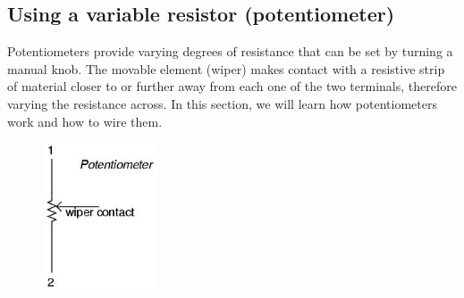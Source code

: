 \documentclass{article}
\begin{document}
\subsection*{Using a variable resistor (potentiometer)}
Potentiometers provide varying degrees of resistance that can be set by turning a manual knob. The movable element (wiper) makes contact with a resistive strip of material closer to or further away from each one of the two terminals, therefore varying the resistance across. In this section, we will learn how potentiometers work and how to wire them.
\begin{figure}[h!]
    	\includegraphics[width=0.3\textwidth]{lab_1_fig_4.jpg}
    	\centering
		\end{figure}
\end{document}
